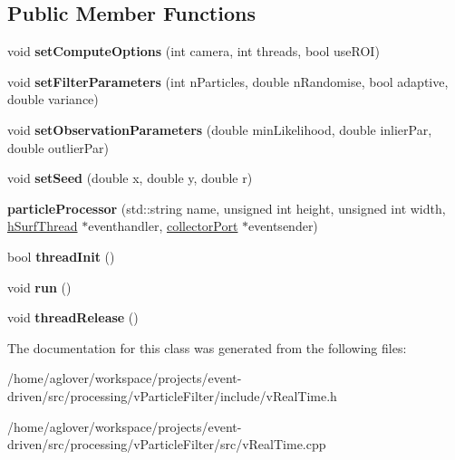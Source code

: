 \subsection*{Public Member Functions}
\begin{DoxyCompactItemize}
\item 
void {\bfseries set\+Compute\+Options} (int camera, int threads, bool use\+R\+OI)\hypertarget{classparticleProcessor_a9ca07fccef931f0a6a82efe058285886}{}\label{classparticleProcessor_a9ca07fccef931f0a6a82efe058285886}

\item 
void {\bfseries set\+Filter\+Parameters} (int n\+Particles, double n\+Randomise, bool adaptive, double variance)\hypertarget{classparticleProcessor_ab7ef098114f6971f0bc24b6556a499b6}{}\label{classparticleProcessor_ab7ef098114f6971f0bc24b6556a499b6}

\item 
void {\bfseries set\+Observation\+Parameters} (double min\+Likelihood, double inlier\+Par, double outlier\+Par)\hypertarget{classparticleProcessor_a77cc8d09e8b52120dc98ac7e3ea89f48}{}\label{classparticleProcessor_a77cc8d09e8b52120dc98ac7e3ea89f48}

\item 
void {\bfseries set\+Seed} (double x, double y, double r)\hypertarget{classparticleProcessor_a520f0f6ab1afc01569c5e14cd4426197}{}\label{classparticleProcessor_a520f0f6ab1afc01569c5e14cd4426197}

\item 
{\bfseries particle\+Processor} (std\+::string name, unsigned int height, unsigned int width, \hyperlink{classev_1_1hSurfThread}{h\+Surf\+Thread} $\ast$eventhandler, \hyperlink{classev_1_1collectorPort}{collector\+Port} $\ast$eventsender)\hypertarget{classparticleProcessor_ac3f2ff8cbd65c236adc91dc3349cd611}{}\label{classparticleProcessor_ac3f2ff8cbd65c236adc91dc3349cd611}

\item 
bool {\bfseries thread\+Init} ()\hypertarget{classparticleProcessor_aafa6595892c7e82b1c42b919dfe6f9f0}{}\label{classparticleProcessor_aafa6595892c7e82b1c42b919dfe6f9f0}

\item 
void {\bfseries run} ()\hypertarget{classparticleProcessor_aed880e77fafb61965d57565735939181}{}\label{classparticleProcessor_aed880e77fafb61965d57565735939181}

\item 
void {\bfseries thread\+Release} ()\hypertarget{classparticleProcessor_ae40c3b11945587c4c23547d7b817299a}{}\label{classparticleProcessor_ae40c3b11945587c4c23547d7b817299a}

\end{DoxyCompactItemize}


The documentation for this class was generated from the following files\+:\begin{DoxyCompactItemize}
\item 
/home/aglover/workspace/projects/event-\/driven/src/processing/v\+Particle\+Filter/include/v\+Real\+Time.\+h\item 
/home/aglover/workspace/projects/event-\/driven/src/processing/v\+Particle\+Filter/src/v\+Real\+Time.\+cpp\end{DoxyCompactItemize}
